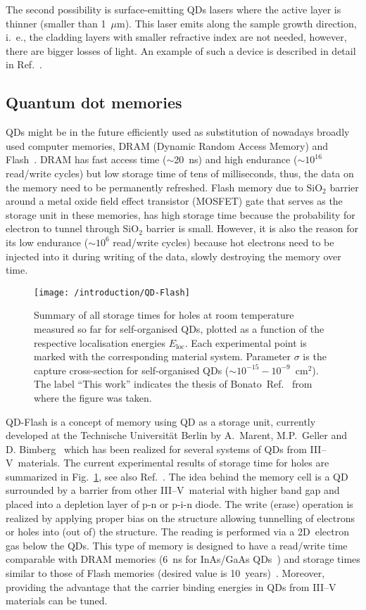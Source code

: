\documentclass[
a4paper, %
11pt, %
onecolumn, %
openany, %
oldfontcommands,
]{memoir}
\begin{document}
The second possibility is surface-emitting QDs lasers where the active layer is thinner (smaller than 1~$\mu$m). This laser emits along the sample growth direction, i.~e., the cladding layers with smaller refractive index are not needed, however, there are bigger losses of light. An example of such a device is described in detail in Ref.~\cite{Saito}.



\subsection*{Quantum dot memories}
QDs might be in the future efficiently used as substitution of nowadays broadly used computer memories, DRAM (Dynamic Random Access Memory) and Flash~\cite{Pavan,Sherwin}. DRAM has fast access time ($\sim$20~ns) and high endurance ($\sim10^{16}$ read/write cycles) but low storage time of tens of milliseconds, thus, the data on the memory need to be permanently refreshed. Flash memory due to SiO$_2$ barrier around a metal oxide field effect transistor (MOSFET) gate that serves as the storage unit in these memories, has high storage time because the probability for electron to tunnel through SiO$_2$ barrier is small. However, it is also the reason for its low endurance ($\sim 10^{6}$ read/write cycles) because hot electrons need to be injected into it during writing of the data, slowly destroying the memory over time. 
%
\begin{figure}
	\centering
	\texttt{[image: /introduction/QD-Flash]}
	\caption{Summary of all storage times for holes at room temperature measured so far for self-organised QDs, plotted as a function of the respective localisation energies $E_\mathrm{loc}$. Each experimental point is marked with the corresponding material system. Parameter $\sigma$ is the capture cross-section for self-organised QDs ($\sim10^{ -15} -10^ {-9}$~cm$^2$). The label \enquote{This work} indicates the thesis of Bonato~Ref.~\cite{t_bonato} from where the figure was taken.}
	\label{fig:intr:QD-flash}
\end{figure}

QD-Flash is a concept of memory using QD as a storage unit, currently developed at the Technische Universität Berlin by A.~Marent, M.P.~Geller and D. Bimberg~\cite{Marent_SST2011_QDFlash} which has been realized for several systems of QDs from III--V~materials. The current experimental results of storage time for holes are summarized in Fig.~\ref{fig:intr:QD-flash}, see also Ref.~\cite{t_bonato}. The idea behind the memory cell is a QD surrounded by a barrier from other III--V~material with higher band gap and placed into a depletion layer of p-n or p-i-n diode. The write (erase) operation is realized by applying proper bias on the structure allowing tunnelling of electrons or holes into (out of) the structure. The reading is performed via a 2D~electron gas below the QDs. This type of memory is designed to have a read/write time comparable with DRAM memories (6~ns for InAs/GaAs QDs~\cite{GellerAPL}) and storage times similar to those of Flash memories (desired value is 10~years)~\cite{GellerAPL,GellerJOP}. Moreover, providing the advantage that the carrier binding energies in QDs from III--V materials can be tuned. 
\end{document}
